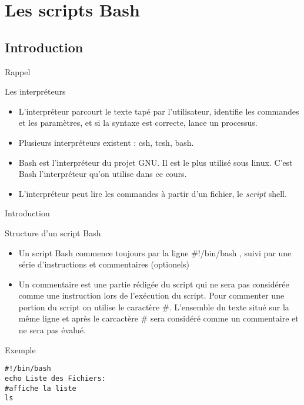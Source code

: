\section{Les scripts Bash}
\subsection{Introduction}
\begin{frame}{Rappel}
\begin{block}{Les interpréteurs}
\begin{itemize}
\item L'interpréteur parcourt le texte tapé par l'utilisateur, identifie les commandes et les paramètres, et si la syntaxe est correcte, lance un processus.
\item Plusieurs interpréteurs existent : csh, tcsh, bash.
\item Bash est l’interpréteur du projet GNU. Il est le plus utilisé sous linux. C'est Bash l'interpréteur qu'on utilise dans ce cours.
\item L'interpréteur peut lire les commandes à partir d'un fichier, le \emph{script} shell.
\end{itemize}
\end{block}
\end{frame}

\begin{frame}[fragile]{Introduction}
\begin{block}{Structure d'un script Bash}
\begin{itemize}
\item Un script Bash commence toujours par la ligne \alert{\#!/bin/bash} , suivi par une série d'instructions et commentaires (optionels)
\item Un commentaire est une partie rédigée du script qui ne sera pas considérée comme une instruction lors de l'exécution du script. Pour commenter une portion du script on utilise le caractère \#. L'ensemble du texte situé sur la même ligne et après le carcactère \# sera considéré comme un commentaire et ne sera pas évalué.
\end{itemize}
\end{block}

\begin{block}{Exemple}
\begin{center}
\begin{verbatim}
#!/bin/bash
echo Liste des Fichiers:
#affiche la liste
ls
\end{verbatim}
\end{center}
\end{block}
\end{frame}

